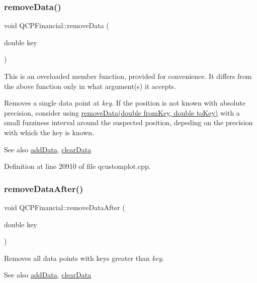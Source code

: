 \subsubsection{\texorpdfstring{remove\+Data()}{removeData()}\hspace{0.1cm}{\footnotesize\ttfamily [2/2]}}
{\footnotesize\ttfamily void Q\+C\+P\+Financial\+::remove\+Data (\begin{DoxyParamCaption}\item[{double}]{key }\end{DoxyParamCaption})}

This is an overloaded member function, provided for convenience. It differs from the above function only in what argument(s) it accepts.

Removes a single data point at {\itshape key}. If the position is not known with absolute precision, consider using \hyperlink{class_q_c_p_financial_a048c741d3c8cc5709c2c44b759fdf27c}{remove\+Data(double from\+Key, double to\+Key)} with a small fuzziness interval around the suspected position, depeding on the precision with which the key is known.

\begin{DoxySeeAlso}{See also}
\hyperlink{class_q_c_p_financial_a1a83396f97fcc68f2b7aa8d9782feffe}{add\+Data}, \hyperlink{class_q_c_p_financial_a11fd49928c33e55e27b7319c6927864a}{clear\+Data} 
\end{DoxySeeAlso}


Definition at line 20910 of file qcustomplot.\+cpp.

\mbox{\label{class_q_c_p_financial_aa0fcd357005288c833a230c7874825ba}} 
\subsubsection{\texorpdfstring{remove\+Data\+After()}{removeDataAfter()}}
{\footnotesize\ttfamily void Q\+C\+P\+Financial\+::remove\+Data\+After (\begin{DoxyParamCaption}\item[{double}]{key }\end{DoxyParamCaption})}

Removes all data points with keys greater than {\itshape key}.

\begin{DoxySeeAlso}{See also}
\hyperlink{class_q_c_p_financial_a1a83396f97fcc68f2b7aa8d9782feffe}{add\+Data}, \hyperlink{class_q_c_p_financial_a11fd49928c33e55e27b7319c6927864a}{clear\+Data} 
\end{DoxySeeAlso}


